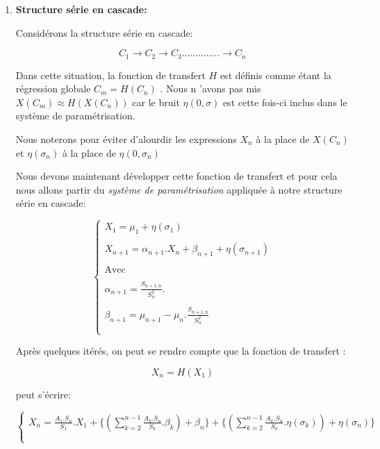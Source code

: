 \documentclass[a4paper]{article}
\begin{document}
\begin{enumerate}
\item \textbf{ Structure série en cascade:}

Considérons la structure série en cascade:

$$C_{1}\longrightarrow C_{2} \longrightarrow C_{3} ..............\longrightarrow C_{n}$$	

Dans cette situation, la fonction de transfert $H$ est définis comme étant  la régression globale $C_{m}=H(C_{n})$ .
Nous n 'avons pas mis  $X(C_{m})\approx H(X(C_{n}))$ car le bruit $\eta(0,\sigma)$ est cette fois-ci inclus dans le système de paramétrisation.

Nous noterons pour éviter d'alourdir les expressions $X_{n}$ à la place de $X(C_{n})$ et $\eta(\sigma_{n})$ à la place de $\eta(0,\sigma_{n})$

Nous devons maintenant  développer  cette fonction de transfert et pour cela nous allons partir du \textit{système de paramétrisation} appliquée à notre structure série en cascade:

\[
\left\lbrace 
\begin{array}{lcl}
X_{1}=\mu_{1}+\eta(\sigma_{1}) \\ \\
X_{n+1}=\alpha_{n+1}.X_{n}+\beta_{n+1}+\eta(\sigma_{n+1})\\ \\ 
\text{Avec}\\ \\

\alpha_{n+1}=\frac{S_{n+1, n}}{S_{n}^{2}}.\\ \\

\beta_{n+1}=\mu_{n+1}-\mu_{n}.\frac{S_{n+1, n}}{S_{n}^{2}} \\ \\

\end{array}\right.
\]




Après quelques itérés, on peut se rendre compte que la fonction de transfert :

$$X_{n}=H(X_{1})$$

peut s'écrire:

\[
\left\lbrace 
\begin{array}{lcl}

X_{n}=\frac{A_{1}.S_{n}}{S_{1}}.X_{1}+\{  (\sum_{k=2}^{n-1}  \frac{A_{k}.S_{n}}{S_{k}}.\beta_{k})+\beta_{n}\}+\{(\sum_{k=2}^{n-1}\frac{A_{k}.S_{n}}{S_{k}}.\eta(\sigma_{k}))+\eta(\sigma_{n})                                                                                   \}    \\ \\      


\end{array}\]
\end{enumerate}
\end{document}
